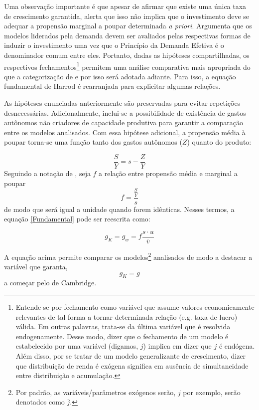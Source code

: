 Uma observação importante é que apesar de \textcite[p.~23]{harrod_essay_1939} afirmar que existe uma única taxa de crescimento garantida, \textcite[p.~83]{robinson_model_1962} alerta que isso não implica que o investimento %
deve se adequar a propensão marginal a poupar determinada \textit{a priori}. Argumenta que os modelos liderados pela demanda devem ser avaliados pelas respectivas formas de induzir o investimento uma vez que o Princípio da Demanda Efetiva é o denominador comum entre eles. Portanto, dadas as hipóteses compartilhadas, os respectivos  fechamentos\footnote{Entende-se por fechamento como variável que assume valores economicamente relevantes de tal forma a tornar determinada relação (e.g. taxa de lucro) válida. Em outras palavras, trata-se da última variável que é resolvida endogenamente. Desse modo, dizer que o fechamento de um modelo é estabelecido por uma variável (digamos, $j$) implica em dizer que $j$ é endógena. Além disso, por se tratar de um modelo generalizante de crescimento, dizer que distribuição de renda é exógena significa em ausência de simultaneidade entre distribuição e acumulação.} permitem uma análise comparativa mais apropriada do que a categorização de \textcite{allain_macroeconomic_2014} e por isso será adotada adiante. Para isso, a equação fundamental de Harrod é rearranjada para explicitar algumas relações.


As hipóteses enunciadas anteriormente são preservadas para evitar repetições desnecessárias. Adicionalmente, inclui-se a possibilidade de existência de gastos autônomos não criadores de capacidade produtiva para garantir a comparação entre os modelos analisados. Com essa hipótese adicional, a propensão média à poupar torna-se uma função tanto dos gastos autônomos ($Z$) quanto do produto:

\begin{equation}
\label{Poupanca_Super}
    \frac{S}{Y} = s - \frac{Z}{Y}
\end{equation}
Seguindo a notação de \textcite{serrano_sraffian_1995}, seja $f$ a relação entre propensão média e marginal a poupar
$$
f = \frac{\frac{S}{Y}}{s}
$$
de modo que será igual a unidade quando forem idênticas. Nesses termos, a equação \ref{Fundamental} pode ser reescrita como:

\begin{equation}
 \label{Sintetica}   
g_K = g_w = f\frac{s\cdot u}{\overline v}
\end{equation}

A equação acima permite comparar os modelos\footnote{Por padrão, as variáveis/parâmetros exógenos serão, $j$ por exemplo, serão denotados como $\overline j$.} analisados de modo a destacar a variável que garanta, 
$$
g_K = g
$$
a começar pelo de Cambridge.
